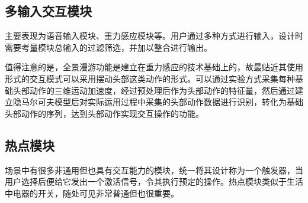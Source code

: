 \subsection{多输入交互模块}
主要表现为语音输入模块、重力感应模块等。用户通过多种方式进行输入，设计时需要考量模块总输入的过滤筛选，并加以整合进行输出。

值得注意的是，全景漫游功能是建立在重力感应的技术基础上的，故最贴近其使用形式的交互模式可以采用摆动头部这类动作的形式。可以通过实验方式采集每种基础头部动作的三维运动加速度，经过预处理后作为头部动作的特征量，然后通过建立隐马尔可夫模型后对实际运用过程中采集的头部动作数据进行识别，转化为基础头部动作的序列，达到头部动作实现交互操作的功能。

\subsection{热点模块}
场景中有很多非通用但也具有交互能力的模块，统一将其设计称为一个触发器，当用户选择后便给它发出一个激活信号，令其执行预定的操作。热点模块类似于生活中电器的开关，随处可见非常普通但也很重要。
